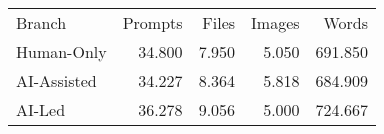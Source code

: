 \begin{tabular}{lrrrr}
\hline\hline
Branch & Prompts & Files & Images & Words \\
Human-Only & 34.800 & 7.950 & 5.050 & 691.850 \\
AI-Assisted & 34.227 & 8.364 & 5.818 & 684.909 \\
AI-Led & 36.278 & 9.056 & 5.000 & 724.667 \\
\hline\hline
\end{tabular}
